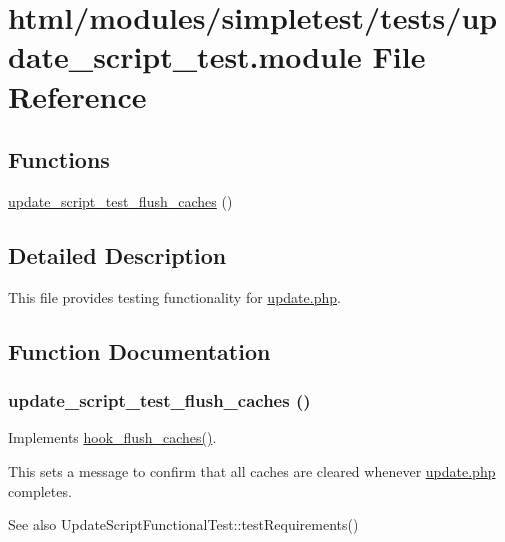 \hypertarget{update__script__test_8module}{
\section{html/modules/simpletest/tests/update\_\-script\_\-test.module File Reference}
\label{update__script__test_8module}
}
\subsection*{Functions}
\begin{DoxyCompactItemize}
\item 
\hyperlink{update__script__test_8module_a1dbc4d1f66296fe9b500a44d63870927}{update\_\-script\_\-test\_\-flush\_\-caches} ()
\end{DoxyCompactItemize}


\subsection{Detailed Description}
This file provides testing functionality for \hyperlink{update_8php}{update.php}. 

\subsection{Function Documentation}
\hypertarget{update__script__test_8module_a1dbc4d1f66296fe9b500a44d63870927}{
\subsubsection[{update\_\-script\_\-test\_\-flush\_\-caches}]{\setlength{\rightskip}{0pt plus 5cm}update\_\-script\_\-test\_\-flush\_\-caches ()}}
\label{update__script__test_8module_a1dbc4d1f66296fe9b500a44d63870927}
Implements \hyperlink{group__hooks_ga66531e6e564157b7ca45ed07549c9b97}{hook\_\-flush\_\-caches()}.

This sets a message to confirm that all caches are cleared whenever \hyperlink{update_8php}{update.php} completes.

\begin{DoxySeeAlso}{See also}
UpdateScriptFunctionalTest::testRequirements() 
\end{DoxySeeAlso}
